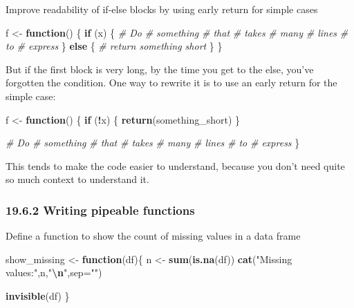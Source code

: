\documentclass[
]{article}
\newenvironment{Shaded}{\begin{snugshade}}{\end{snugshade}}
\newcommand{\AttributeTok}[1]{\textcolor[rgb]{0.13,0.29,0.53}{#1}}
\newcommand{\CommentTok}[1]{\textcolor[rgb]{0.56,0.35,0.01}{\textit{#1}}}
\newcommand{\ControlFlowTok}[1]{\textcolor[rgb]{0.13,0.29,0.53}{\textbf{#1}}}
\newcommand{\FunctionTok}[1]{\textcolor[rgb]{0.13,0.29,0.53}{\textbf{#1}}}
\newcommand{\NormalTok}[1]{#1}
\newcommand{\OtherTok}[1]{\textcolor[rgb]{0.56,0.35,0.01}{#1}}
\newcommand{\SpecialCharTok}[1]{\textcolor[rgb]{0.81,0.36,0.00}{\textbf{#1}}}
\newcommand{\StringTok}[1]{\textcolor[rgb]{0.31,0.60,0.02}{#1}}
\begin{document}
Improve readability of if-else blocks by using early return for simple
cases

\begin{Shaded}
\begin{Highlighting}[]
\NormalTok{f }\OtherTok{\textless{}{-}} \ControlFlowTok{function}\NormalTok{() \{}
  \ControlFlowTok{if}\NormalTok{ (x) \{}
    \CommentTok{\# Do }
    \CommentTok{\# something}
    \CommentTok{\# that}
    \CommentTok{\# takes}
    \CommentTok{\# many}
    \CommentTok{\# lines}
    \CommentTok{\# to}
    \CommentTok{\# express}
\NormalTok{  \} }\ControlFlowTok{else}\NormalTok{ \{}
    \CommentTok{\# return something short}
\NormalTok{  \}}
\NormalTok{\}}
\end{Highlighting}
\end{Shaded}

But if the first block is very long, by the time you get to the else,
you've forgotten the condition. One way to rewrite it is to use an early
return for the simple case:

\begin{Shaded}
\begin{Highlighting}[]
\NormalTok{f }\OtherTok{\textless{}{-}} \ControlFlowTok{function}\NormalTok{() \{}
  \ControlFlowTok{if}\NormalTok{ (}\SpecialCharTok{!}\NormalTok{x) \{}
    \FunctionTok{return}\NormalTok{(something\_short)}
\NormalTok{  \}}

  \CommentTok{\# Do }
  \CommentTok{\# something}
  \CommentTok{\# that}
  \CommentTok{\# takes}
  \CommentTok{\# many}
  \CommentTok{\# lines}
  \CommentTok{\# to}
  \CommentTok{\# express}
\NormalTok{\}}
\end{Highlighting}
\end{Shaded}

This tends to make the code easier to understand, because you don't need
quite so much context to understand it.

\hypertarget{writing-pipeable-functions}{%
\subsubsection{19.6.2 Writing pipeable
functions}\label{writing-pipeable-functions}}

Define a function to show the count of missing values in a data frame

\begin{Shaded}
\begin{Highlighting}[]
\NormalTok{show\_missing }\OtherTok{\textless{}{-}} \ControlFlowTok{function}\NormalTok{(df)\{}
\NormalTok{  n }\OtherTok{\textless{}{-}} \FunctionTok{sum}\NormalTok{(}\FunctionTok{is.na}\NormalTok{(df))}
  \FunctionTok{cat}\NormalTok{(}\StringTok{"Missing values:"}\NormalTok{,n,}\StringTok{"}\SpecialCharTok{\textbackslash{}n}\StringTok{"}\NormalTok{,}\AttributeTok{sep=}\StringTok{""}\NormalTok{)}
  
  \FunctionTok{invisible}\NormalTok{(df)}
\NormalTok{\}}
\end{Highlighting}
\end{Shaded}
\end{document}

